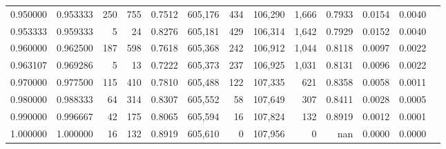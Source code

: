 \begin{tabular}{rrrrrrrrrrrrr}
0.950000 & 0.953333 &    250 &   755 &                                     0.7512 & 605,176 &     434 & 106,290 &   1,666 & 0.7933 & 0.0154 & 0.0040 \\
0.953333 & 0.959333 &      5 &    24 &                                     0.8276 & 605,181 &     429 & 106,314 &   1,642 & 0.7929 & 0.0152 & 0.0040 \\
0.960000 & 0.962500 &    187 &   598 &                                     0.7618 & 605,368 &     242 & 106,912 &   1,044 & 0.8118 & 0.0097 & 0.0022 \\
0.963107 & 0.969286 &      5 &    13 &                                     0.7222 & 605,373 &     237 & 106,925 &   1,031 & 0.8131 & 0.0096 & 0.0022 \\
0.970000 & 0.977500 &    115 &   410 &                                     0.7810 & 605,488 &     122 & 107,335 &     621 & 0.8358 & 0.0058 & 0.0011 \\
0.980000 & 0.988333 &     64 &   314 &                                     0.8307 & 605,552 &      58 & 107,649 &     307 & 0.8411 & 0.0028 & 0.0005 \\
0.990000 & 0.996667 &     42 &   175 &                                     0.8065 & 605,594 &      16 & 107,824 &     132 & 0.8919 & 0.0012 & 0.0001 \\
1.000000 & 1.000000 &     16 &   132 &                                     0.8919 & 605,610 &       0 & 107,956 &       0 &    nan & 0.0000 & 0.0000 \\
\bottomrule
\end{tabular}
